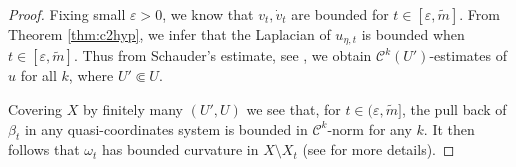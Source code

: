 \documentclass[11pt]{amsart}
\numberwithin{equation}{section}
\begin{document}
\begin{proof}
Fixing small $\varepsilon>0$, we know that $v_t, \dot{v}_t$ are bounded for $t\in [\varepsilon,\tilde{m}]$. From Theorem \ref{thm:c2hyp}, we infer that the Laplacian of $u_{\eta,t}$ is bounded when $t\in [\varepsilon,\tilde{m}]$. Thus from Schauder's estimate, see \cite[Theorem 4.1.4]{BG12}, 
we obtain ${\mathcal C}^k(U')$-estimates of $u$ for all $k$, where $U'\Subset U$.

Covering $X$ by finitely many $(U',U)$ we see that, for $t\in (\varepsilon, \tilde{m}]$, the pull back of $\beta_t$ in any quasi-coordinates system is bounded in 
${\mathcal C}^k$-norm for any $k$. It then follows that $\omega_t$ has bounded curvature in $X\setminus X_t$ (see \cite{TY86} for more details).  
\end{proof}
  




 
\end{document}
